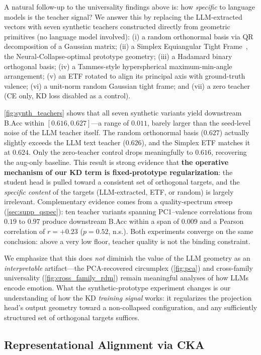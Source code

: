 A natural follow-up to the universality findings above is: how \emph{specific} to language models is the teacher signal? We answer this by replacing the LLM-extracted vectors with seven synthetic teachers constructed directly from geometric primitives (no language model involved): (i) a random orthonormal basis via QR decomposition of a Gaussian matrix; (ii) a Simplex Equiangular Tight Frame~\cite{papyan2020neural}, the Neural-Collapse-optimal prototype geometry; (iii) a Hadamard binary orthogonal basis; (iv) a Tammes-style hyperspherical maximum-min-angle arrangement; (v) an ETF rotated to align its principal axis with ground-truth valence; (vi) a unit-norm random Gaussian tight frame; and (vii) a zero teacher (CE only, KD loss disabled as a control).

\cref{fig:synth_teachers} shows that all seven synthetic variants yield downstream B.Acc within $[0.616, 0.627]$---a range of $0.011$, barely larger than the seed-level noise of the LLM teacher itself. The random orthonormal basis ($0.627$) actually slightly exceeds the LLM text teacher ($0.626$), and the Simplex ETF matches it at $0.624$. Only the zero-teacher control drops meaningfully to $0.616$, recovering the aug-only baseline. This result is strong evidence that \textbf{the operative mechanism of our KD term is fixed-prototype regularization}: the student head is pulled toward a consistent set of orthogonal targets, and the \emph{specific content} of the targets (LLM-extracted, ETF, or random) is largely irrelevant. Complementary evidence comes from a quality-spectrum sweep (\cref{sec:supp_qspec}): ten teacher variants spanning PC1--valence correlations from $0.19$ to $0.97$ produce downstream B.Acc within a span of $0.009$ and a Pearson correlation of $r = +0.23$ ($p = 0.52$, n.s.). Both experiments converge on the same conclusion: above a very low floor, teacher quality is not the binding constraint.

We emphasize that this does \emph{not} diminish the value of the LLM geometry as an \emph{interpretable} artifact---the PCA-recovered circumplex (\cref{fig:pca}) and cross-family universality (\cref{fig:cross_family_rdm}) remain meaningful analyses of how LLMs encode emotion. What the synthetic-prototype experiment changes is our understanding of how the KD \emph{training signal} works: it regularizes the projection head's output geometry toward a non-collapsed configuration, and any sufficiently structured set of orthogonal targets suffices.

\subsection{Representational Alignment via CKA}
\label{sec:cka}
\vspace{-1mm}


